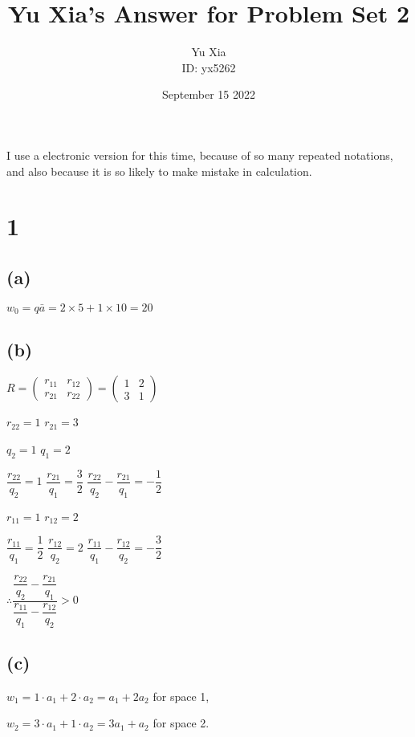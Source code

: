 \documentclass{article}
\author{Yu Xia \\ ID: yx5262}
\title{Yu Xia's Answer for Problem Set 2}
\date{September 15 2022}
\begin{document}
\maketitle

\nocite{*}

I use a electronic version for this time, because of so many repeated notations, and also because it is so likely to make mistake in calculation.

\section*{1}

\subsection*{(a)}

$w_{0}=q\bar{a}=2\times5+1\times10=\boxed{20}$

\subsection*{(b)}

$R=\begin{pmatrix}
    r_{11} & r_{12} \\
    r_{21} & r_{22}
\end{pmatrix}=\begin{pmatrix}
    1 & 2 \\
    3 & 1
\end{pmatrix}$

$r_{22}=1$ $r_{21}=3$

$q_{2}=1$  $q_{1}=2$

$\dfrac{r_{22}}{q_{2}}=1$ $\dfrac{r_{21}}{q_{1}}=\dfrac{3}{2}$ $\dfrac{r_{22}}{q_{2}}-\dfrac{r_{21}}{q_{1}}=-\dfrac{1}{2}$

$r_{11}=1$ $r_{12}=2$ 

$\dfrac{r_{11}}{q_{1}}=\dfrac{1}{2}$ $\dfrac{r_{12}}{q_{2}}=2$ $\dfrac{r_{11}}{q_{1}}-\dfrac{r_{12}}{q_{2}}=-\dfrac{3}{2}$

$\therefore \dfrac{\dfrac{r_{22}}{q_{2}}-\dfrac{r_{21}}{q_{1}}}{\dfrac{r_{11}}{q_{1}}-\dfrac{r_{12}}{q_{2}}}>0 $

\subsection*{(c)}

$w_{1}=1\cdot a_{1}+2\cdot a_{2}=a_{1}+2a_{2}$ for space 1,

$w_{2}=3\cdot a_{1}+1\cdot a_{2}=3a_{1}+a_{2}$ for space 2.
\end{document}
